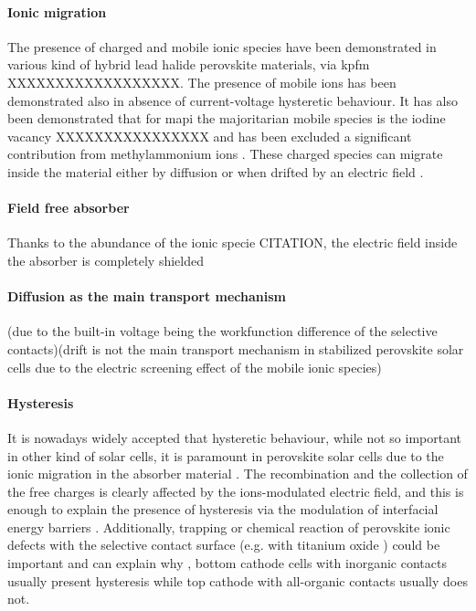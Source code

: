 	\paragraph{Ionic migration}
	The presence of charged and mobile ionic species have been demonstrated in various kind of hybrid lead halide perovskite materials, via \gls{kpfm} \cite{Birkhold2018} XXXXXXXXXXXXXXXXXX.
	The presence of mobile ions has been demonstrated also in absence of current-voltage hysteretic behaviour\cite{Calado2016,Jacobs2018}.
	It has also been demonstrated that for \gls{mapi} the majoritarian mobile species is the iodine vacancy XXXXXXXXXXXXXXXX \cite{Senocrate2017} and has been excluded a significant contribution from methylammonium ions \cite{Senocrate2018,Senocrate2017}.
	These charged species can migrate inside the material either by diffusion or when drifted by an electric field \cite{Xiao2014}.
	
	\paragraph{Field free absorber}
	Thanks to the abundance of the ionic specie CITATION, the electric field inside the absorber is completely shielded \cite{Tress2015}
	
	\paragraph{Diffusion as the main transport mechanism}(due to the built-in voltage being the workfunction difference of the selective contacts)(drift is not the main transport mechanism in stabilized perovskite solar cells due to the electric screening effect of the mobile ionic species)


\paragraph{Hysteresis}
It is nowadays widely accepted that hysteretic behaviour, while not so important in other kind of solar cells, it is paramount in perovskite solar cells due to the ionic migration in the absorber material \cite{Unger2014,Xiao2014}. 
The recombination and the collection of the free charges is clearly affected by the ions-modulated electric field, and this is enough to explain the presence of hysteresis \cite{Tress2015,Calado2016} via the modulation of interfacial energy barriers \cite{Moia2019}.
Additionally, trapping or chemical reaction of perovskite ionic defects with the selective contact surface (e.g. with titanium oxide \cite{Yu2016,Beilsten-Edmands2015}) could be important and can explain why \cite{Moia2019}, bottom cathode cells with inorganic contacts usually present hysteresis while top cathode with all-organic contacts usually does not. 

